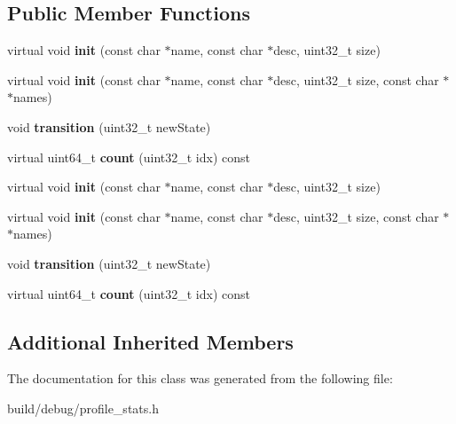 \subsection*{Public Member Functions}
\begin{DoxyCompactItemize}
\item 
\hypertarget{classTimeBreakdownStat_a9aae6c3f1caecd26468fd753e2358487}{virtual void {\bfseries init} (const char $\ast$name, const char $\ast$desc, uint32\-\_\-t size)}\label{classTimeBreakdownStat_a9aae6c3f1caecd26468fd753e2358487}

\item 
\hypertarget{classTimeBreakdownStat_a562dfa6c2b1316bcafd0ffaf96e72b5f}{virtual void {\bfseries init} (const char $\ast$name, const char $\ast$desc, uint32\-\_\-t size, const char $\ast$$\ast$names)}\label{classTimeBreakdownStat_a562dfa6c2b1316bcafd0ffaf96e72b5f}

\item 
\hypertarget{classTimeBreakdownStat_af1486fd238a6dbe9d98d45b33e4c712a}{void {\bfseries transition} (uint32\-\_\-t new\-State)}\label{classTimeBreakdownStat_af1486fd238a6dbe9d98d45b33e4c712a}

\item 
\hypertarget{classTimeBreakdownStat_a48f5204f3168cc77e0fdd457e42195f2}{virtual uint64\-\_\-t {\bfseries count} (uint32\-\_\-t idx) const }\label{classTimeBreakdownStat_a48f5204f3168cc77e0fdd457e42195f2}

\item 
\hypertarget{classTimeBreakdownStat_a9aae6c3f1caecd26468fd753e2358487}{virtual void {\bfseries init} (const char $\ast$name, const char $\ast$desc, uint32\-\_\-t size)}\label{classTimeBreakdownStat_a9aae6c3f1caecd26468fd753e2358487}

\item 
\hypertarget{classTimeBreakdownStat_a562dfa6c2b1316bcafd0ffaf96e72b5f}{virtual void {\bfseries init} (const char $\ast$name, const char $\ast$desc, uint32\-\_\-t size, const char $\ast$$\ast$names)}\label{classTimeBreakdownStat_a562dfa6c2b1316bcafd0ffaf96e72b5f}

\item 
\hypertarget{classTimeBreakdownStat_af1486fd238a6dbe9d98d45b33e4c712a}{void {\bfseries transition} (uint32\-\_\-t new\-State)}\label{classTimeBreakdownStat_af1486fd238a6dbe9d98d45b33e4c712a}

\item 
\hypertarget{classTimeBreakdownStat_a48f5204f3168cc77e0fdd457e42195f2}{virtual uint64\-\_\-t {\bfseries count} (uint32\-\_\-t idx) const }\label{classTimeBreakdownStat_a48f5204f3168cc77e0fdd457e42195f2}

\end{DoxyCompactItemize}
\subsection*{Additional Inherited Members}


The documentation for this class was generated from the following file\-:\begin{DoxyCompactItemize}
\item 
build/debug/profile\-\_\-stats.\-h\end{DoxyCompactItemize}
